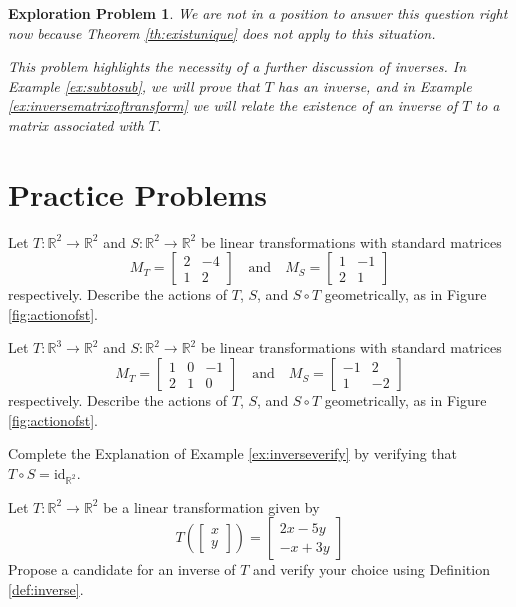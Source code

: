 \documentclass{ximera}
\newcommand{\RR}{\mathbb{R}}
\newcommand{\id}{\text{id}}
\newtheorem{initprob}{Exploration Problem}
\begin{document}
\begin{initprob}
We are not in a position to answer this question right now because Theorem \ref{th:existunique} does not apply to this situation. 

This problem highlights the necessity of a further discussion of inverses.  In Example \ref{ex:subtosub}, we will prove that $T$ has an inverse, and in Example \ref{ex:inversematrixoftransform} we will relate the existence of an inverse of $T$ to a matrix associated with $T$.
\end{initprob}

\section*{Practice Problems}
\begin{problem}
Let $T:\RR^2\rightarrow \RR^2$ and $S:\RR^2\rightarrow \RR^2$ be linear transformations with standard matrices 
$$M_T=\begin{bmatrix}2&-4\\1&2\end{bmatrix}\quad\text{and}\quad M_S=\begin{bmatrix}1&-1\\2&1\end{bmatrix}$$
respectively.  Describe the actions of $T$, $S$, and $S\circ T$ geometrically, as in Figure \ref{fig:actionofst}.
\end{problem}
\begin{problem}
Let $T:\RR^3\rightarrow \RR^2$ and $S:\RR^2\rightarrow \RR^2$ be linear transformations with standard matrices 
$$M_T=\begin{bmatrix}1&0&-1\\2&1&0\end{bmatrix}\quad\text{and}\quad M_S=\begin{bmatrix}-1&2\\1&-2\end{bmatrix}$$
respectively.  Describe the actions of $T$, $S$, and $S\circ T$ geometrically, as in Figure \ref{fig:actionofst}.
\end{problem}
\begin{problem}
Complete the Explanation of Example \ref{ex:inverseverify} by verifying that $T\circ S=\id_{\RR^2}$.
\end{problem}
\begin{problem}
Let $T:\RR^2\rightarrow \RR^2$ be a linear transformation given by 
$$T\left(\begin{bmatrix}x\\y\end{bmatrix}\right)=\begin{bmatrix}2x-5y\\-x+3y\end{bmatrix}$$
Propose a candidate for an inverse of $T$ and verify your choice using Definition \ref{def:inverse}.
\end{problem}
\end{document}
